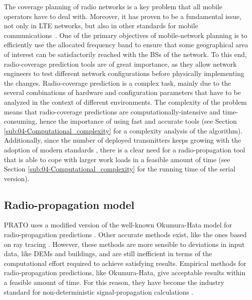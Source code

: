 The coverage planning of radio networks is a key problem that all
mobile operators have to deal with. Moreover, it has proven to be
a fundamental issue, not only in LTE networks, but also in other standards
for mobile communications~\cite{Saleh_On_the_coveraga_extension_in_LTE_networks:2010,Shabbir_Comparison_of_radio_propagation_models:2011,Siomina:Minimum.pilot.power.for.service.coverage,Valcarce_Applying.FDTD.to.the.coverage.prediction.of.WiMAX:2009}.
One of the primary objectives of mobile-network planning is to efficiently
use the allocated frequency band to ensure that some geographical
area of interest can be satisfactorily reached with the BSs of the
network. To this end, radio-coverage prediction tools are of great
importance, as they allow network engineers to test different network
configurations before physically implementing the changes. Radio-coverage
prediction is a complex task, mainly due to the several combinations
of hardware and configuration parameters that have to be analyzed
in the context of different environments. The complexity of the problem
means that radio-coverage predictions are computationally-intensive
and time-consuming, hence the importance of using fast and accurate
tools (see Section \ref{sub:04-Computational_complexity} for a complexity
analysis of the algorithm). Additionally, since the number of deployed
transmitters keeps growing with the adoption of modern standards \cite{Saleh_On_the_coveraga_extension_in_LTE_networks:2010},
there is a clear need for a radio-propagation tool that is able to
cope with larger work loads in a feasible amount of time (see Section
\ref{sub:04-Computational_complexity} for the running time of the
serial version).


\subsection{Radio-propagation model \label{sub:04-Radio_propagation_model}}

PRATO uses a modified version of the well-known Okumura-Hata model
for radio-propagation predictions \cite{Hata_Empirical_formula_for_propagation_loss_in_land_mobile_radio_services:1980}.
Other accurate methods exist, like the ones based on ray tracing \cite{Corre_Three_dimensional_urban_EM_wave_propagation_model_for_radio_network_planning_and_optimization_over_large_areas:2009,Vilhar-Efficient_open_source_ray_tracing_methods_for_rural_environment:efficient}.
However, these methods are more sensible to deviations in input data,
like DEMs and buildings, and are still inefficient in terms of the
computational effort required to achieve satisfying results. Empirical
methods for radio-propagation predictions, like Okumura-Hata, give
acceptable results within a feasible amount of time. For this reason,
they have become the industry standard for non-deterministic signal-propagation
calculations \cite{Begovic_Applicability_evaluation_of_Okumura_Ericsson_and_Winner_propagation_models_for_coverage_planning:2012,Cichon_Propagation.prediction.models:1995,Hata-Empirical_formula_for_propagation_loss_in_land_mobile_radio_services:1980,Shabbir_Comparison_of_radio_propagation_models:2011,Song_Evolved_cellular_network_planning_and_optimization_for_UMTS_and_LTE:2010}.

